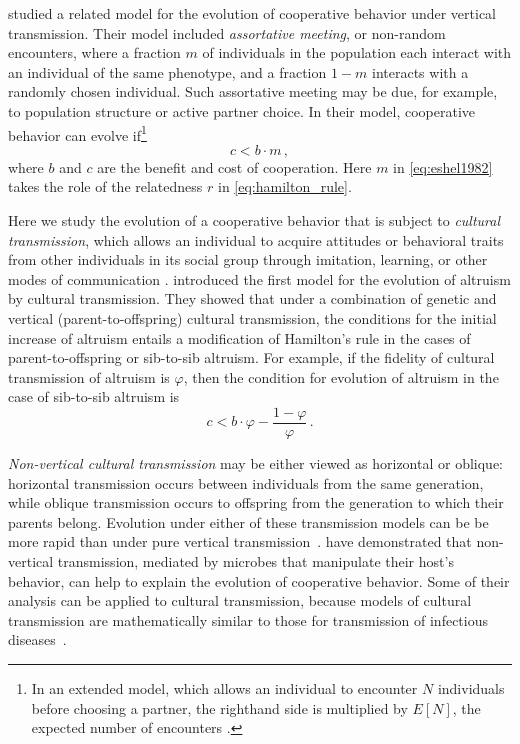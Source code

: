 \documentclass[12pt]{extarticle}
\begin{document}
\citet{Eshel1982} studied a related model for the evolution of cooperative behavior under vertical transmission. Their model included \emph{assortative meeting}, or non-random encounters, where a fraction $m$ of individuals in the population each interact with an individual of the same phenotype, and a fraction $1-m$ interacts  with a randomly chosen individual.  
Such assortative meeting may be due, for example, to population structure or active partner choice.
In their model, cooperative behavior can evolve if\footnote{In an extended model, which allows an individual to encounter $N$ individuals before choosing a partner, the righthand side is multiplied by $E[N]$, the expected number of encounters \citep[eq.~4.6]{Eshel1982}.
} 
\citep[eq.~3.2]{Eshel1982}
\begin{equation} \label{eq:eshel1982}
c < b \cdot m \,,
\end{equation}
where $b$ and $c$ are the benefit and cost of cooperation. 
Here $m$ in \autoref{eq:eshel1982} takes the role of the relatedness $r$  in \autoref{eq:hamilton_rule}.

Here we study the evolution of a cooperative behavior that is subject to \emph{cultural transmission}, which allows an individual to acquire attitudes or behavioral traits from other individuals in its social group through imitation, learning, or other modes of communication \citep{cavalli1981cultural,richerson2008not}.
\citet{feldman1985gene} introduced the first model for the evolution of altruism by cultural transmission.
They showed that under a combination of genetic and vertical (parent-to-offspring) cultural transmission, the conditions for the initial increase of altruism entails a modification of Hamilton's rule in the cases of parent-to-offspring or sib-to-sib altruism.
For example, if the fidelity of cultural transmission of altruism is $\varphi$, then the condition for evolution of altruism in the case of sib-to-sib altruism is \citep[Eq.~16]{feldman1985gene}
\begin{equation} \label{eq:feldman1985}
c < b \cdot \varphi - \frac{1-\varphi}{\varphi} \,.
\end{equation}

\emph{Non-vertical cultural transmission} may be either viewed as horizontal or oblique: horizontal transmission occurs between individuals from the same generation, while oblique transmission occurs  to  offspring from the generation to which their parents belong. 
Evolution under either of these transmission models  can be be more rapid than under pure vertical transmission~\citep{cavalli1981cultural,lycett2008questions,ram2018evolution}.
\citet{lewin2017microbes} have demonstrated that non-vertical transmission, mediated by microbes that manipulate their host's behavior, can help to explain the evolution of cooperative behavior. Some of their analysis can be applied to cultural transmission, because models of cultural transmission are mathematically similar to those for transmission of infectious diseases~\citep{cavalli1981cultural}.
\end{document}
